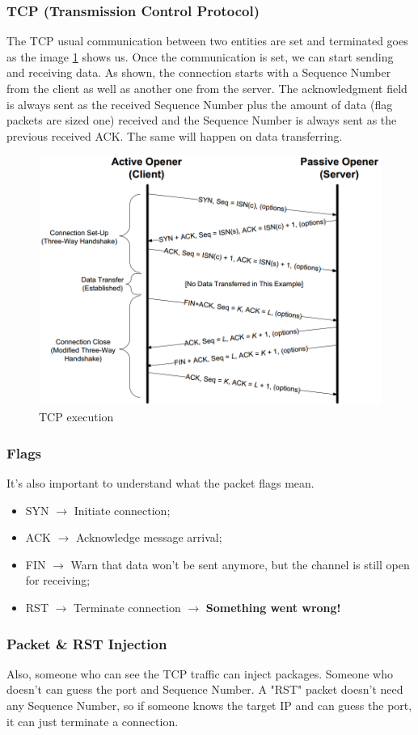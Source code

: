 \documentclass[11pt]{article}
\begin{document}
{\subsubsection{TCP (Transmission Control Protocol)}
\label{sec:org13ac913}
The TCP usual communication between two entities are set and terminated goes as the image \ref{tcp} shows us. Once the communication is set, we can start sending and receiving data. As shown, the connection starts with a Sequence Number from the client as well as another one from the server. The acknowledgment field is always sent as the received Sequence Number plus the amount of data (flag packets are sized one) received and the Sequence Number is always sent as the previous received ACK. The same will happen on data transferring.  

\begin{figure}[htbp]
\centering
\includegraphics[height=0.5\textwidth]{res/TCP.png}
\caption{\label{tcp}
TCP execution}
\end{figure} 

\subsubsection{Flags}
\label{sec:orgff72e27}
It's also important to understand what the packet flags mean.
\begin{itemize}
\item SYN \(\to\) Initiate connection;
\item ACK \(\to\) Acknowledge message arrival;
\item FIN \(\to\) Warn that data won't be sent anymore, but the channel is still open for receiving;
\item RST \(\to\) Terminate connection \(\to\) \textbf{Something went wrong!}
\end{itemize}
\subsubsection{Packet \& RST Injection}
\label{sec:orgdafbab6}
Also, someone who can see the TCP traffic can inject packages. Someone who doesn't can guess the port and Sequence Number. A "RST" packet doesn't need any Sequence Number, so if someone knows the target IP and can guess the port, it can just terminate a connection.
}
\end{document}
